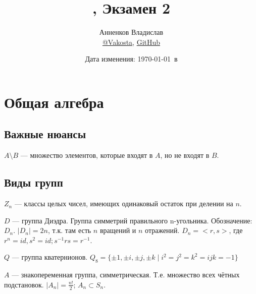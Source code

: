 \documentclass[a4paper]{article}
\title{\HugeАлгебра, Экзамен 2}
\author{
Анненков Владислав \\
\href{https://teleg.run/Vakosta}{@Vakosta},
\href{https://github.com/Vakosta/hse-tex}{GitHub} \\
}
\date{Дата изменения: \today \ в \currenttime}
\theoremstyle{named}
\begin{document}
    \maketitle
    \tableofcontents
    \newpage

    \section{Общая алгебра}
    \begin{colloq}

        \subsection{Важные нюансы}

        \(A \setminus B\) — множество элементов, которые входят в \(A\), но не входят в \(B\).


        \newline

        \subsection{Виды групп}\label{subsec:виды-групп}

        \begin{definition}
            \(Z_n\) — классы целых чисел, имеющих одинаковый остаток при делении на \(n\).
        \end{definition}

        \begin{definition}
            \(D\) — группа Диэдра.
            Группа симметрий правильного n-угольника.\newline
            Обозначение: \(D_n\). \(|D_n| = 2n\), т.к. там есть \(n\) вращений и \(n\) отражений.\newline
            \(D_n = <r, s>\), где \(r^n = id, s^2 = id; s^{-1}rs = r^{-1}\).
        \end{definition}

        \begin{definition}
            \(Q\) — группа кватернионов.
            \(Q_8 = \{ \pm 1, \pm i, \pm j, \pm k \mid i^2 = j^2 = k^2 = ijk = -1 \}\)
        \end{definition}

        \begin{definition}
            \(A\) — знакопеременная группа, симметрическая.
            Т.е. множество всех чётных подстановок.
            \(|A_n| = \frac{n!}{2}\); \(A_n \subset S_n\).


\end{definition}
\end{colloq}
\end{document}
